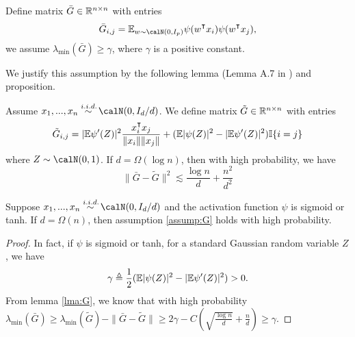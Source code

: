 \begin{assumption}
\label{assump:G}
Define matrix $\bar{G} \in \mathbb{R}^{n\times n}$ with entries
\begin{equation}
    \bar{G}_{i,j} = \E_{w\sim \calN(0,I_p)}\psi(w\transpose x_i) \psi(w\transpose  x_j),
\end{equation}
we assume $\lambda_{\min}(\bar{G}) \geq \gamma$, where $\gamma$ is a positive constant.
\end{assumption}
We justify this assumption by the following lemma (Lemma A.7 in \citep{gao2020model}) and proposition.
\begin{lemma}
\label{lma:G}
Assume $x_1,...,x_n \overset{\iid}{\sim} \calN(0,I_d/d)$. We define  matrix $\tilde{G}\in \mathbb{R}^{n\times n}$ with entries
\begin{equation}
    \tilde{G}_{i,j} = |\E\psi'(Z)|^2 \frac{x_i\transpose x_j}{\|x_i\|\|x_j\|} + (\E|\psi(Z)|^2-|\E\psi'(Z)|^2)\I\{i=j\}
\end{equation}
where $Z\sim \calN(0,1)$. If $d = \Omega(\log n)$, then with high probability, we have
\begin{equation}
\|\bar{G}-\tilde{G}\|^2 \lesssim \frac{\log n}{d} + \frac{n^2}{d^2}
\end{equation}
\end{lemma}

\begin{proposition}
Suppose $x_1,...,x_n \overset{\iid}{\sim} \calN(0,I_d/d)$ and the activation function $\psi$ is sigmoid or tanh. If $d=\Omega(n)$, then assumption \ref{assump:G} holds with high probability.
\end{proposition}
\begin{proof}
In fact, if $\psi$ is sigmoid or tanh, for a standard Gaussian random variable $Z$, we have
\begin{equation*}
    \gamma\triangleq \frac{1}{2}(\mathbb{E}|\psi(Z)|^2-|\mathbb{E}\psi'(Z)|^2) >0.
\end{equation*}
From lemma \ref{lma:G}, we know that with high probability $\lambda_{\min}(\bar{G}) \geq \lambda_{\min}(\tilde{G})-\|\bar{G}-\tilde{G}\|\geq 2\gamma - C(\sqrt{\frac{\log n}{d}} + \frac{n}{d}) \geq \gamma$.
\end{proof}

